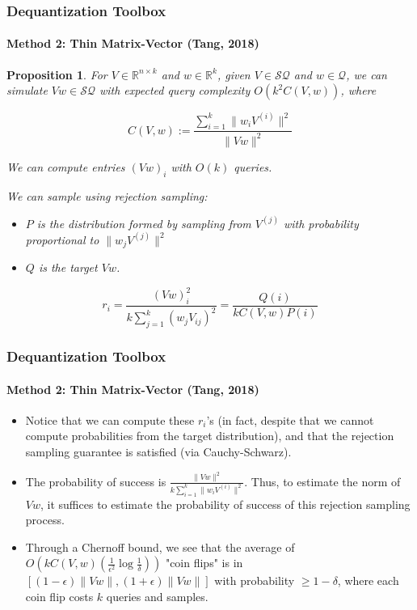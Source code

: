\documentclass{beamer}
\newcommand\0{\mathbf{0}}
\newcommand\RR{\mathbb{R}}
\newcommand\<{\langle}
\renewcommand\>{\rangle}
\newtheorem{proposition}{Proposition}[theorem]
\begin{document}
\begin{frame}
\frametitle{Dequantization Toolbox}
\framesubtitle{Method 2: Thin Matrix-Vector (Tang, 2018)}
\begin{proposition}
	 For $V \in \RR^{n\times k}$ and $w \in \RR^k$, given $V \in \mathcal{SQ}$ and $w \in \mathcal{Q}$, we can simulate $Vw \in \mathcal{SQ}$ with expected query complexity $O(k^2C(V,w))$, where

$$C(V,w) := \frac{\sum_{i=1}^k\|w_iV^{(i)}\|^2}{\|Vw\|^2}$$

We can compute entries $(Vw)_i$ with $O(k)$ queries.

We can sample using rejection sampling:

\begin{itemize}
\item $P$ is the distribution formed by sampling from $V^{(j)}$ with probability proportional to $\|w_jV^{(j)}\|^2$
  
\item $Q$ is the target $Vw$.
\end{itemize}

$$r_i = \frac{(Vw)_i^2}{k \sum_{j=1}^k (w_jV_{ij})^2} = \frac{Q(i)}{kC(V,w)P(i)}$$
\end{proposition}
\end{frame}

\begin{frame}
\frametitle{Dequantization Toolbox}
\framesubtitle{Method 2: Thin Matrix-Vector (Tang, 2018)}
\begin{itemize}
\item Notice that we can compute these $r_i$'s (in fact, despite that we cannot compute probabilities from the target distribution), and that the rejection sampling guarantee is satisfied (via Cauchy-Schwarz).

\item The probability of success is $\frac{\|Vw\|^2}{k\sum_{i=1}^k\|w_iV^{(i)}\|^2}$. Thus, to estimate the norm of $Vw$, it suffices to estimate the probability of success of this rejection sampling process.

\item Through a Chernoff bound, we see that the average of $O(kC(V,w)(\frac{1}{\epsilon^2}\log\frac{1}{\delta}))$ "coin flips" is in $[(1-\epsilon)\|Vw\|,(1+\epsilon)\|Vw\|]$ with probability $\geq 1-\delta$, where each coin flip costs $k$ queries and samples.	
\end{itemize}
\end{frame}
\end{document}
